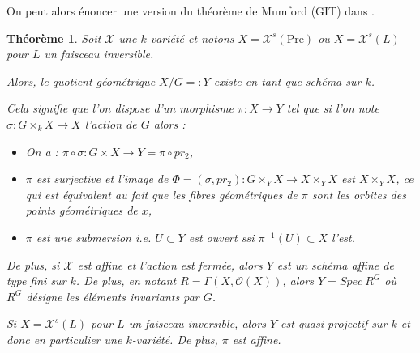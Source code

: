 \documentclass[11pt]{article}
\newcommand{\Pre}{\mathrm{Pre}}
\newtheorem{thm}{Théorème}[section]
\begin{document}
On peut alors énoncer une version du théorème de Mumford (GIT) dans \cite{GIT}.
\begin{thm}\label{GIT alébrique}
Soit $\mathcal{X}$ une $k$-variété et notons $X = \mathcal{X}^s(\Pre)$ ou $X = \mathcal{X}^s(L)$ pour $L$ un faisceau inversible.

Alors, le quotient géométrique $X/G =:Y$ existe en tant que schéma sur $k$.  

Cela signifie que l'on dispose d'un morphisme $\pi : X \rightarrow Y$ tel que si l'on note $\sigma : G\times_k X \rightarrow X$ l'action de $G$ alors :
\begin{itemize}
\item On a : $\pi \circ \sigma : G\times X \rightarrow Y = \pi \circ pr_2$,
\item $\pi$ est surjective et l'image de $\Phi = (\sigma, pr_2): G\times_Y X \rightarrow X\times_Y X$ est $X\times_Y X$, ce qui est équivalent au fait que les fibres géométriques de $\pi$ sont les orbites des points géométriques de $x$,
\item $\pi$ est une submersion i.e. $U \subset Y$ est ouvert ssi $\pi^{-1}(U) \subset X$ l'est.
\end{itemize}

De plus, si $\mathcal{X}$ est affine et l'action est fermée, alors $Y$ est un schéma affine de type fini sur $k$. De plus, en notant $R = \Gamma(X, \mathcal{O}(X))$, alors $Y = Spec~R^G$ où $R^G$ désigne les éléments invariants par $G$.

Si $X = \mathcal{X}^s(L)$ pour $L$ un faisceau inversible, alors $Y$ est quasi-projectif sur $k$ et donc en particulier une $k$-variété. De plus, $\pi$ est affine.
\end{thm}
\end{document}
